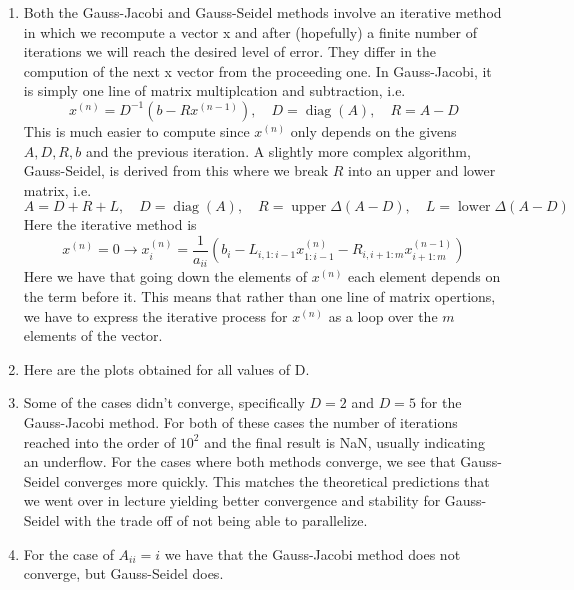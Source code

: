 \documentclass{article}
\DeclareMathOperator{\diag}{diag}
\DeclareMathOperator{\upper}{upper}
\DeclareMathOperator{\lowtri}{lower}
\begin{document}
    \begin{enumerate}

        \item Both the Gauss-Jacobi and Gauss-Seidel methods involve an iterative method in which we recompute a vector x and after (hopefully) a finite number of iterations we will reach the desired level of error. They differ in the compution of the next x vector from the proceeding one. In Gauss-Jacobi, it is simply one line of matrix multiplcation and subtraction, i.e.
    \[
        x^{(n)} = D^{-1}(b - Rx^{(n-1)}), \quad D = \diag(A), \quad R = A - D
    \]
    This is much easier to compute since $x^{(n)}$ only depends on the givens $A, D, R, b$ and the previous iteration. A slightly more complex algorithm, Gauss-Seidel, is derived from this where we break $R$ into an upper and lower matrix, i.e.
    \[
        A = D + R + L, \quad D = \diag(A), \quad R = \upper\Delta(A - D), \quad L = \lowtri\Delta(A - D)    
    \]
    Here the iterative method is 
    \[
        x^{(n)} = 0 \to x_i^{(n)} = \frac{1}{a_{ii}}(b_i - L_{i, 1:i-1}x_{1:i-1}^{(n)} - R_{i, i+1:m}x_{i+1:m}^{(n-1)})
    \]
    Here we have that going down the elements of $x^{(n)}$ each element depends on the term before it. This means that rather than one line of matrix opertions, we have to express the iterative process for $x^{(n)}$ as a loop over the $m$ elements of the vector. 

    \item

    Here are the plots obtained for all values of D. 

    \item 
        
    Some of the cases didn't converge, specifically $D = 2$ and $D = 5$ for the Gauss-Jacobi method. For both of these cases the number of iterations reached into the order of $10^2$ and the final result is NaN, usually indicating an underflow. For the cases where both methods converge, we see that Gauss-Seidel converges more quickly. This matches the theoretical predictions that we went over in lecture yielding better convergence and stability for Gauss-Seidel with the trade off of not being able to parallelize. 

    \item 
    For the case of $A_{ii} = i$ we have that the Gauss-Jacobi method does not converge, but Gauss-Seidel does. 

    \end{enumerate}
\end{document}

